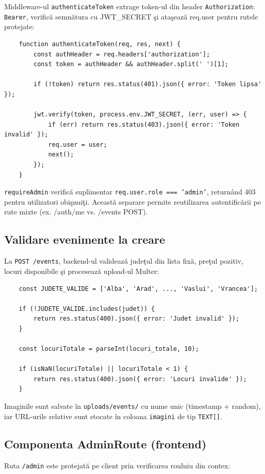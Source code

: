 Middleware-ul \texttt{authenticateToken} extrage token-ul din header \texttt{Authorization}: \texttt{Bearer}, verific\u a semn\u atura cu JWT\_SECRET \c si ata\c seaz\u a req.user pentru rutele protejate:

\begin{lstlisting}
	function authenticateToken(req, res, next) {
		const authHeader = req.headers['authorization'];
		const token = authHeader && authHeader.split(' ')[1];
		
		if (!token) return res.status(401).json({ error: 'Token lipsa' });
		
		jwt.verify(token, process.env.JWT_SECRET, (err, user) => {
			if (err) return res.status(403).json({ error: 'Token invalid' });
			req.user = user;
			next();
		});
	}
\end{lstlisting}

\texttt{requireAdmin} verific\u a suplimentar \texttt{req.user.role === 'admin'}, return\^and 403 pentru utilizatori obi\c snui\c ti. Aceast\u a separare permite reutilizarea autentific\u arii pe rute mixte (ex. /auth/me vs. /events POST).

\subsection{Validare evenimente la creare}

La \texttt{POST /events}, backend-ul valideaz\u a jude\c tul din lista fix\u a, pre\c tul pozitiv, locuri disponibile \c si proceseaz\u a upload-ul Multer:

\begin{lstlisting}
	const JUDETE_VALIDE = ['Alba', 'Arad', ..., 'Vaslui', 'Vrancea'];
	
	if (!JUDETE_VALIDE.includes(judet)) {
		return res.status(400).json({ error: 'Judet invalid' });
	}
	
	const locuriTotale = parseInt(locuri_totale, 10);
	
	if (isNaN(locuriTotale) || locuriTotale < 1) {
		return res.status(400).json({ error: 'Locuri invalide' });
	}
\end{lstlisting}

Imaginile sunt salvate \^in \texttt{uploads/events/} cu nume unic (timestamp + random), iar URL-urile relative sunt stocate \^in coloana \texttt{imagini} de tip \texttt{TEXT[]}.

\subsection{Componenta AdminRoute (frontend)}
Ruta \texttt{/admin} este protejat\u a pe client prin verificarea rouluiu din contex:

